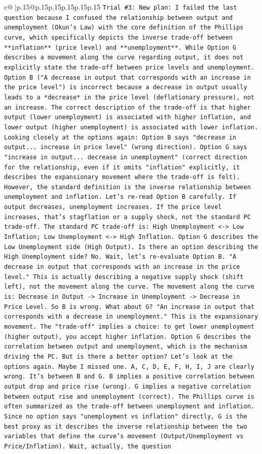 \documentclass{article}
\begin{document}
{\begin{supertabular}{c@{$\;$}|p{.15\linewidth}@{}p{.15\linewidth}p{.15\linewidth}p{.15\linewidth}p{.15\linewidth}p{.15\linewidth}}
{{{\texttt{Trial \#3: New plan: I failed the last question because I confused the relationship between output and unemployment (Okun's Law) with the core definition of the Phillips curve, which specifically depicts the inverse trade{-}off between **inflation** (price level) and **unemployment**. While Option G describes a movement along the curve regarding output, it does not explicitly state the trade{-}off between price levels and unemployment. Option B ("A decrease in output that corresponds with an increase in the price level") is incorrect because a decrease in output usually leads to a *decrease* in the price level (deflationary pressure), not an increase. The correct description of the trade{-}off is that higher output (lower unemployment) is associated with higher inflation, and lower output (higher unemployment) is associated with lower inflation. Looking closely at the options again: Option B says "decrease in output... increase in price level" (wrong direction). Option G says "increase in output... decrease in unemployment" (correct direction for the relationship, even if it omits "inflation" explicitly, it describes the expansionary movement where the trade{-}off is felt). However, the standard definition is the inverse relationship between unemployment and inflation. Let's re{-}read Option B carefully. If output decreases, unemployment increases. If the price level increases, that's stagflation or a supply shock, not the standard PC trade{-}off. The standard PC trade{-}off is: High Unemployment <{-}> Low Inflation; Low Unemployment <{-}> High Inflation. Option G describes the Low Unemployment side (High Output). Is there an option describing the High Unemployment side? No. Wait, let's re{-}evaluate Option B. "A decrease in output that corresponds with an increase in the price level." This is actually describing a negative supply shock (shift left), not the movement along the curve. The movement along the curve is: Decrease in Output {-}> Increase in Unemployment {-}> Decrease in Price Level. So B is wrong. What about G? "An increase in output that corresponds with a decrease in unemployment." This is the expansionary movement. The "trade{-}off" implies a choice: to get lower unemployment (higher output), you accept higher inflation. Option G describes the correlation between output and unemployment, which is the mechanism driving the PC. But is there a better option? Let's look at the options again. Maybe I missed one. A, C, D, E, F, H, I, J are clearly wrong. It's between B and G. B implies a positive correlation between output drop and price rise (wrong). G implies a negative correlation between output rise and unemployment (correct). The Phillips curve is often summarized as the trade{-}off between unemployment and inflation. Since no option says "unemployment vs inflation" directly, G is the best proxy as it describes the inverse relationship between the two variables that define the curve's movement (Output/Unemployment vs Price/Inflation). Wait, actually, the question} \\
}}}
\end{supertabular}}
\end{document}
